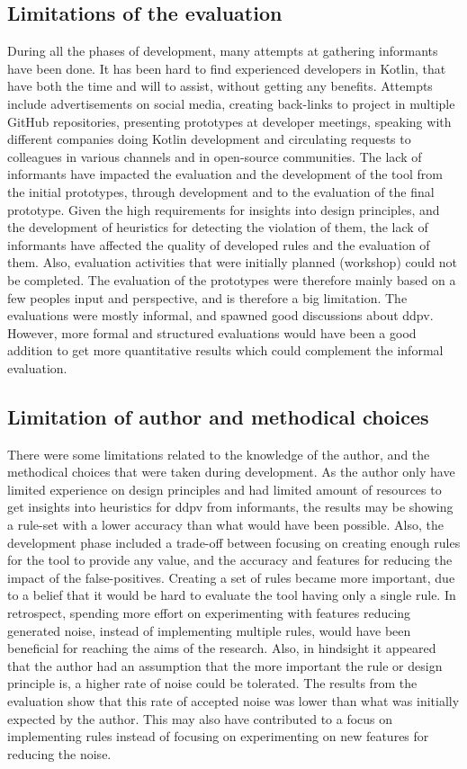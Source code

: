 \documentclass{report}
\begin{document}
\subsection*{Limitations of the evaluation}
During all the phases of development, many attempts at gathering informants have been done. It has been hard to find experienced developers in Kotlin, that have both the time and will to assist, without getting any benefits. Attempts include advertisements on social media, creating back-links to project in multiple GitHub repositories, presenting prototypes at developer meetings, speaking with different companies doing Kotlin development and circulating requests to colleagues in various channels and in open-source communities. The lack of informants have impacted the evaluation and the development of the tool from the initial prototypes, through development and to the evaluation of the final prototype. Given the high requirements for insights into design principles, and the development of heuristics for detecting the violation of them, the lack of informants have affected the quality of developed rules and the evaluation of them. Also, evaluation activities that were initially planned (workshop) could not be completed. The evaluation of the prototypes were therefore mainly based on a few peoples input and perspective, and is therefore a big limitation. The evaluations were mostly informal, and spawned good discussions about \gls{ddpv}. However, more formal and structured evaluations would have been a good addition to get more quantitative results which could complement the informal evaluation.


\subsection*{Limitation of author and methodical choices}
There were some limitations related to the knowledge of the author, and the methodical choices that were taken during development. As the author only have limited experience on design principles and had limited amount of resources to get insights into heuristics for \gls{ddpv} from informants, the results may be showing a rule-set with a lower accuracy than what would have been possible. Also, the development phase included a trade-off between focusing on creating enough rules for the tool to provide any value, and the accuracy and features for reducing the impact of the false-positives. Creating a set of rules became more important, due to a belief that it would be hard to evaluate the tool having only a single rule. In retrospect, spending more effort on experimenting with features reducing generated noise, instead of implementing multiple rules, would have been beneficial for reaching the aims of the research. Also, in hindsight it appeared that the author had an assumption that the more important the rule or design principle is, a higher rate of noise could be tolerated. The results from the evaluation show that this rate of accepted noise was lower than what was initially expected by the author. This may also have contributed to a focus on implementing rules instead of focusing on experimenting on new features for reducing the noise. 
\end{document}
